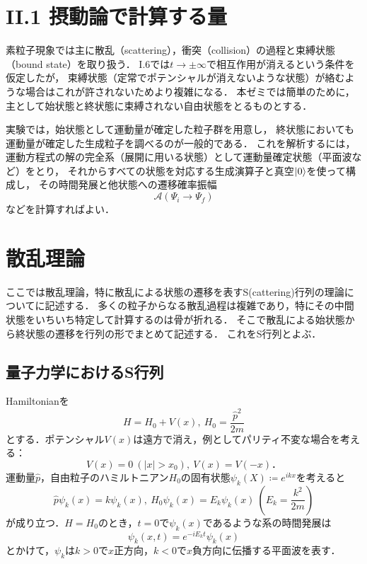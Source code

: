 \documentclass[dvipdfmx,uplatex]{jsarticle}
\numberwithin{theorem}{section}
\numberwithin{reibangou}{section}
\numberwithin{reidaibangou}{section}
\numberwithin{mondaibangou}{section}
\begin{document}
\section*{II.1 摂動論で計算する量}
素粒子現象では主に散乱（scattering），衝突（collision）の過程と束縛状態（bound state）を取り扱う．
I.6では$t \to \pm \infty$で相互作用が消えるという条件を仮定したが，
束縛状態（定常でポテンシャルが消えないような状態）が絡むような場合はこれが許されないためより複雑になる．
本ゼミでは簡単のために，主として始状態と終状態に束縛されない自由状態をとるものとする．

実験では，始状態として運動量が確定した粒子群を用意し，
終状態においても運動量が確定した生成粒子を調べるのが一般的である．
これを解析するには，運動方程式の解の完全系（展開に用いる状態）として運動量確定状態（平面波など）をとり，
それからすべての状態を対応する生成演算子と真空$\ket{0}$を使って構成し，
その時間発展と他状態への遷移確率振幅
\begin{equation}
    \mathcal{A}(\Psi_i \to \Psi_f)
\end{equation}
などを計算すればよい．

\section*{散乱理論\cite{佐藤SGC}}
ここでは散乱理論，特に散乱による状態の遷移を表すS(cattering)行列の理論についてに記述する．
多くの粒子からなる散乱過程は複雑であり，特にその中間状態をいちいち特定して計算するのは骨が折れる．
そこで散乱による始状態から終状態の遷移を行列の形でまとめて記述する．
これをS行列とよぶ．

\subsection*{量子力学におけるS行列}
Hamiltonianを
\begin{equation}
    H = H_0 + V(x),\ H_0 = \frac{\hat{p}^2}{2m}
\end{equation}
とする．ポテンシャル$V(x)$は遠方で消え，例としてパリティ不変な場合を考える：
\begin{equation}
    V(x) = 0\ (|x| > x_0),\ V(x) = V(-x)．
\end{equation}
運動量$\hat{p}$，自由粒子のハミルトニアン$H_0$の固有状態$\psi_k(X) \coloneq e^{ikx}$を考えると
\begin{equation}
    \hat{p} \psi_k (x) = k \psi_k (x),\ H_0 \psi_k (x) = E_k \psi_k (x)\ \left( E_k = \frac{k^2}{2m} \right)
\end{equation}
が成り立つ．$H = H_0$のとき，$t=0$で$\psi_k (x)$であるような系の時間発展は
\begin{equation}
    \psi_k (x, t) = e^{-iE_k t} \psi_k (x)
\end{equation}
とかけて，$\psi_k$は$k>0$で$x$正方向，$k<0$で$x$負方向に伝播する平面波を表す．
\end{document}
